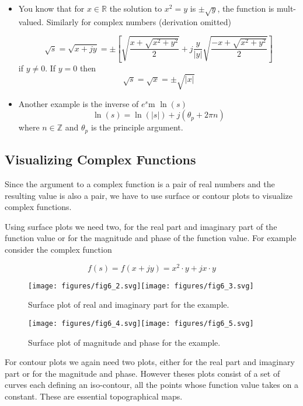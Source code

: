 \documentclass{article}
\begin{document}
\begin{itemize}
\item You know that for $x\in\mathbb{R}$ the solution to $x^2 = y$ is $\pm \sqrt{y}$, the function is mult-valued. Similarly for complex numbers (derivation omitted)

  \[
  \sqrt{s} = \sqrt{x + jy} = \pm \left[\sqrt{\frac{x + \sqrt{x^2 + y^2}}{2}} + j\frac{y}{|y|} \sqrt{\frac{-x + \sqrt{x^2 + y^2}}{2}}\right] 
  \]
  if $y \neq 0$. If $y = 0$ then
  \[
  \sqrt{s} = \sqrt{x} = \pm \sqrt{|x|}
  \]
  
\item Another example is the inverse of $e^s$m $\ln(s)$
  \[
  \ln(s) = \ln(|s|) + j(\theta_p + 2\pi n)  
  \]
  where $n\in\mathbb{Z}$ and $\theta_p$ is the principle argument.
\end{itemize}

\subsection{Visualizing Complex Functions}

Since the argument to a complex function is a pair of real numbers and the resulting value is also a pair, we have to use surface or contour plots to visualize complex functions.

Using surface plots we need two, for the real part and imaginary part of the function value or for the magnitude and phase of the function value. For example consider the complex function

\[
f(s) = f(x + jy) = x^2\cdot y + jx\cdot y
\]

\begin{figure}
  \centering
  \texttt{[image: figures/fig6\_2.svg]}\texttt{[image: figures/fig6\_3.svg]}
  \caption{Surface plot of real and imaginary part for the example.}
\end{figure}

\begin{figure}
  \centering
  \texttt{[image: figures/fig6\_4.svg]}\texttt{[image: figures/fig6\_5.svg]}
  \caption{Surface plot of magnitude and phase for the example.}
\end{figure}

For contour plots we again need two plots, either for the real part and imaginary part or for the magnitude and phase. However theses plots consist of a set of curves each defining an iso-contour, all the points whose function value takes on a constant. These are essential topographical maps.
\end{document}
